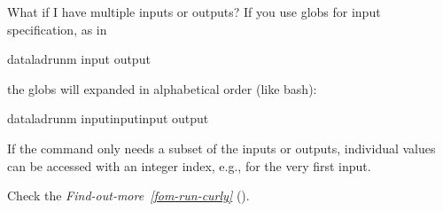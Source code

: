 \begin{findoutmore}[label={fom-multiple-inoutputs}, before title={\thetcbcounter\ }, float, floatplacement=tb, check odd page=true]{What if I have multiple inputs or outputs?}
\sphinxAtStartPar
If you use globs for input specification, as in

\begin{sphinxVerbatim}[commandchars=\\\{\}]
dataladrun\PYGZhy{}m
\PYGZhy{}\PYGZhy{}input
\PYGZhy{}\PYGZhy{}output
\end{sphinxVerbatim}

\sphinxAtStartPar
the globs will expanded in alphabetical order (like bash):

\begin{sphinxVerbatim}[commandchars=\\\{\}]
dataladrun\PYGZhy{}m
\PYGZhy{}\PYGZhy{}input\PYGZhy{}\PYGZhy{}input\PYGZhy{}\PYGZhy{}input
\PYGZhy{}\PYGZhy{}output
\end{sphinxVerbatim}

\sphinxAtStartPar
If the command only needs a subset of the inputs or outputs, individual values
can be accessed with an integer index, e.g.,  for the very first
input.

\sphinxAtStartPar
Check the \textit{Find-out-more}~{\findoutmoreiconinline}\textit{\ref{fom-run-curly}} {\hyperref[\detokenize{basics/101-110-run2:fom-run-curly}]{}} ().


\end{findoutmore}

